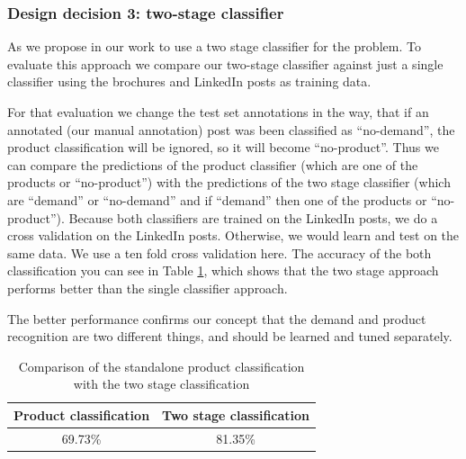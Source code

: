 \subsubsection{Design decision 3: two-stage classifier}
\label{sub:two_stage_classifier}

As we propose in our work to use a two stage classifier for the \nto problem.
To evaluate this approach we compare our two-stage classifier against just a single classifier using the brochures and LinkedIn posts as training data.

For that evaluation we change the test set annotations in the way, that if an annotated (our manual annotation) post was been classified as ``no-demand'', the product classification will be ignored, so it will become ``no-product''.
Thus we can compare the predictions of the product classifier (which are one of the products or ``no-product'') with the predictions of the two stage classifier (which are ``demand'' or ``no-demand'' and if ``demand'' then one of the products or ``no-product'').
Because both classifiers are trained on the LinkedIn posts, we do a cross validation on the LinkedIn posts.
Otherwise, we would learn and test on the same data.
We use a ten fold cross validation here.
The accuracy of the both classification you can see in Table \ref{table:two_stage_eval}, which shows that the two stage approach performs better than the single classifier approach.

The better performance confirms our concept that the demand and product recognition are two different things, and should be learned and tuned separately.

\begin{table}
	\centering
	\begin{tabular}{c|c}
		\hline
		Product classification & Two stage classification \\ \hline \hline
		69.73\% & 81.35\% \\ \hline
	\end{tabular}
	\caption{Comparison of the standalone product classification with the two stage classification}
	\label{table:two_stage_eval}
\end{table}
